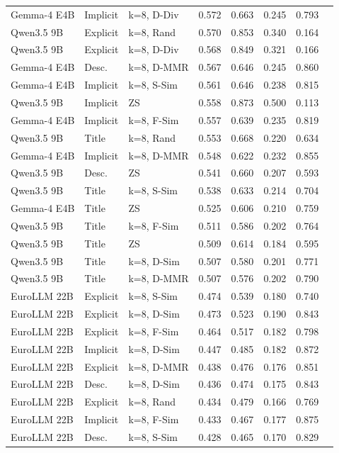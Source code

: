 \begin{longtable}{lllrrrrr}
Gemma-4 E4B & Implicit & k=8, D-Div & 0.572 & 0.663 & 0.245 & 0.793 \\
Qwen3.5 9B & Explicit & k=8, Rand & 0.570 & 0.853 & 0.340 & 0.164 \\
Qwen3.5 9B & Explicit & k=8, D-Div & 0.568 & 0.849 & 0.321 & 0.166 \\
Gemma-4 E4B & Desc. & k=8, D-MMR & 0.567 & 0.646 & 0.245 & 0.860 \\
Gemma-4 E4B & Implicit & k=8, S-Sim & 0.561 & 0.646 & 0.238 & 0.815 \\
Qwen3.5 9B & Implicit & ZS & 0.558 & 0.873 & 0.500 & 0.113 \\
Gemma-4 E4B & Implicit & k=8, F-Sim & 0.557 & 0.639 & 0.235 & 0.819 \\
Qwen3.5 9B & Title & k=8, Rand & 0.553 & 0.668 & 0.220 & 0.634 \\
Gemma-4 E4B & Implicit & k=8, D-MMR & 0.548 & 0.622 & 0.232 & 0.855 \\
Qwen3.5 9B & Desc. & ZS & 0.541 & 0.660 & 0.207 & 0.593 \\
Qwen3.5 9B & Title & k=8, S-Sim & 0.538 & 0.633 & 0.214 & 0.704 \\
Gemma-4 E4B & Title & ZS & 0.525 & 0.606 & 0.210 & 0.759 \\
Qwen3.5 9B & Title & k=8, F-Sim & 0.511 & 0.586 & 0.202 & 0.764 \\
Qwen3.5 9B & Title & ZS & 0.509 & 0.614 & 0.184 & 0.595 \\
Qwen3.5 9B & Title & k=8, D-Sim & 0.507 & 0.580 & 0.201 & 0.771 \\
Qwen3.5 9B & Title & k=8, D-MMR & 0.507 & 0.576 & 0.202 & 0.790 \\
EuroLLM 22B & Explicit & k=8, S-Sim & 0.474 & 0.539 & 0.180 & 0.740 \\
EuroLLM 22B & Explicit & k=8, D-Sim & 0.473 & 0.523 & 0.190 & 0.843 \\
EuroLLM 22B & Explicit & k=8, F-Sim & 0.464 & 0.517 & 0.182 & 0.798 \\
EuroLLM 22B & Implicit & k=8, D-Sim & 0.447 & 0.485 & 0.182 & 0.872 \\
EuroLLM 22B & Explicit & k=8, D-MMR & 0.438 & 0.476 & 0.176 & 0.851 \\
EuroLLM 22B & Desc. & k=8, D-Sim & 0.436 & 0.474 & 0.175 & 0.843 \\
EuroLLM 22B & Explicit & k=8, Rand & 0.434 & 0.479 & 0.166 & 0.769 \\
EuroLLM 22B & Implicit & k=8, F-Sim & 0.433 & 0.467 & 0.177 & 0.875 \\
EuroLLM 22B & Desc. & k=8, S-Sim & 0.428 & 0.465 & 0.170 & 0.829 \\

\end{longtable}
